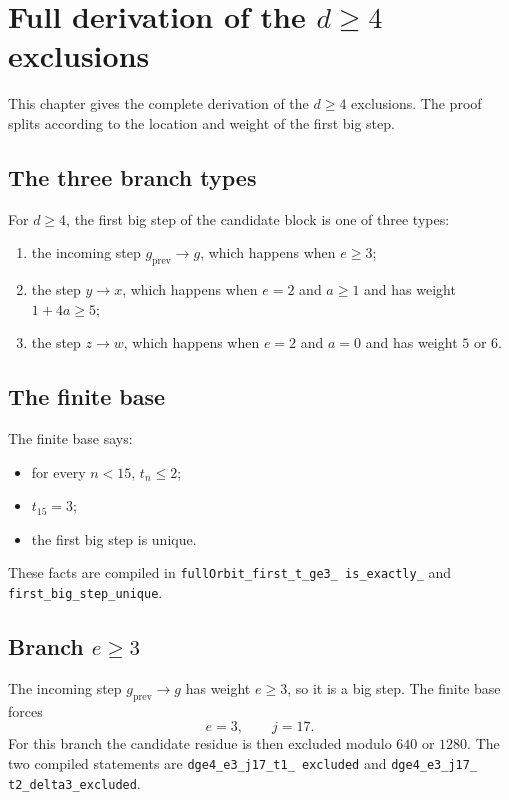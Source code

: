 \section{Full derivation of the $d\ge4$ exclusions}

This chapter gives the complete derivation of the $d\ge4$ exclusions.
The proof splits according to the location and weight of the first
big step.

\subsection{The three branch types}

For $d\ge4$, the first big step of the candidate block is one of
three types:
\begin{enumerate}[leftmargin=*]
\item the incoming step $g_{\mathrm{prev}}\to g$, which happens when
  $e\ge3$;
\item the step $y\to x$, which happens when $e=2$ and $a\ge1$ and has
  weight $1+4a\ge5$;
\item the step $z\to w$, which happens when $e=2$ and $a=0$ and has
  weight $5$ or $6$.
\end{enumerate}

\subsection{The finite base}

The finite base says:
\begin{itemize}[leftmargin=*]
\item for every $n<15$, $t_n\le2$;
\item $t_{15}=3$;
\item the first big step is unique.
\end{itemize}
These facts are compiled in
\texttt{fullOrbit\_\allowbreak first\_\allowbreak t\_\allowbreak ge3\_
\allowbreak is\_\allowbreak exactly\_} and
\texttt{first\_\allowbreak big\_\allowbreak step\_\allowbreak unique}.

\subsection{Branch $e\ge3$}

The incoming step $g_{\mathrm{prev}}\to g$ has weight $e\ge3$, so it
is a big step.  The finite base forces
\begin{equation*}
  e=3,\qquad j=17.
\end{equation*}
For this branch the candidate residue is then excluded modulo $640$
or $1280$.  The two compiled statements are
\texttt{dge4\_\allowbreak e3\_\allowbreak j17\_\allowbreak t1\_\allowbreak
excluded} and
\texttt{dge4\_\allowbreak e3\_\allowbreak j17\_\allowbreak
t2\_\allowbreak delta3\_\allowbreak excluded}.

